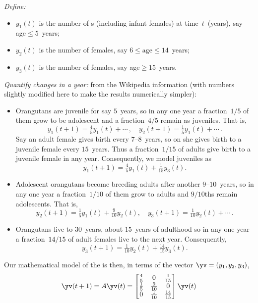 \begin{example}[orangutans]
\begin{solution}
\emph{Define:}
\begin{itemize}
\item \(y_1(t)\) is the number of  s (including infant females) at time~\(t\)~(years), say age\({}\leq5\)~years;
\item \(y_2(t)\) is the number of  females, say \(6\leq\text{age}\leq 14\)~years;
\item \(y_3(t)\) is the number of  females, say age\({}\geq15\)~years.
\end{itemize}
\emph{Quantify changes in a year:} from the Wikipedia information (with numbers slightly modified here to make the results numerically simpler):
\begin{itemize}
\item Orangutans are juvenile for say \(5\)~years, so in any one year a fraction~\(1/5\) of them grow to be adolescent and a fraction~\(4/5\) remain as juveniles.
That is,
\begin{equation*}
y_1(t+1)=\tfrac45y_1(t)+\cdots\,,\quad y_2(t+1)=\tfrac15y_1(t)+\cdots\,.
\end{equation*}
Say an adult female gives birth every \(7\)--\(8\)~years, so on  she gives birth to a juvenile female every \(15\)~years. 
Thus a fraction~\(1/15\) of adults give birth to a juvenile female in any year.
Consequently, we model juveniles as 
\begin{equation*}
{y_1}(t+1)=\tfrac45y_1(t)+\tfrac1{15}y_3(t).
\end{equation*}
\item Adolescent orangutans become breeding adults after another \(9\)--\(10\)~years, so in any one year a fraction~\(1/10\) of them grow to adults and \(9/10\)ths remain adolescents.
That is, 
\begin{equation*}
{y_2(t+1)}=\tfrac15y_1(t)+\tfrac9{10}y_2(t),\quad
{y_3(t+1)}=\tfrac1{10}y_2(t)+\cdots\,.
\end{equation*}

\item Orangutans live to 30~years, about \(15\)~years of adulthood so in any one year a fraction~\(14/15\) of adult females live to the next year.  
Consequently, 
\begin{equation*}
{y_3(t+1)}=\tfrac1{10}y_2(t)+\tfrac{14}{15}y_3(t).
\end{equation*}

\end{itemize}

Our mathematical model of the  is then, in terms of the vector \(\yv=(y_1,y_2,y_3)\),  
\begin{equation*}
\yv(t+1)=A\yv(t)
=\begin{bmatrix} \frac45&0&\frac1{15}
\\\frac15&\frac9{10}&0
\\0&\frac1{10}&\frac{14}{15} \end{bmatrix}\yv(t)
\end{equation*}


\end{solution}
\end{example}
